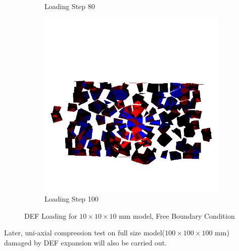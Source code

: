 \begin{figure}[ht!]
\begin{subfigure}{.33\textwidth}
      \caption{Loading Step 80}
      \end{subfigure}%
      \begin{subfigure}{.33\textwidth}
        \centering
        \includegraphics[width=1.0\linewidth]{Files/Small_DEF/Free_IS2/DEP5-STEP(120).png}
        \caption{Loading Step 100}
      \end{subfigure}
  
  \caption{DEF Loading for $10 \times 10 \times 10$ mm model, Free Boundary Condition}
  \label{fig:DEF_Loading_s_free}
\end{figure}

Later, uni-axial compression test on full size model($100 \times 100 \times 100$ mm) damaged by DEF expansion will also be carried out.
